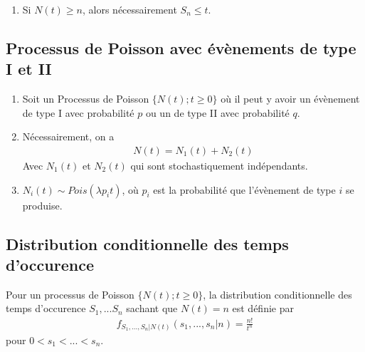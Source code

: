 \documentclass[10pt, french, landscape]{article}
\begin{document}
\begin{multicols*}{3}
\begin{enumerate}[label=\faAngleRight]
\item Si $N(t) \geq n$, alors nécessairement $S_n \leq t$.
\end{enumerate}

\subsection*{Processus de Poisson avec évènements de type I et II}
\begin{enumerate}[label=\faAngleRight]
\item Soit un Processus de Poisson $\{N(t) ; t \geq 0 \}$ où il peut y avoir un évènement de type I avec probabilité $p$ ou un de type II avec probabilité $q$.
\item Nécessairement, on a
\begin{align*}
N(t) = N_1(t) + N_2(t)
\end{align*}
Avec $N_1(t)$ et $N_2(t)$ qui sont stochastiquement indépendants.

\item $N_i(t) \sim Pois(\lambda p_i t)$, où $p_i$ est la probabilité que l'évènement de type $i$ se produise.
\end{enumerate}


\subsection*{Distribution conditionnelle des temps d'occurence}
Pour un processus de Poisson $\{ N(t) ; t \geq 0 \}$, la distribution conditionnelle des temps d'occurence $S_1, ... S_n$ sachant que $N(t) = n$ est définie par
\begin{align*}
f_{S_1, ..., S_n | N(t)}(s_1, ..., s_n | n) = \frac{n!}{t^n}
\end{align*}
pour $0 < s_1 < ... < s_n$.
\end{multicols*}

\end{document}

